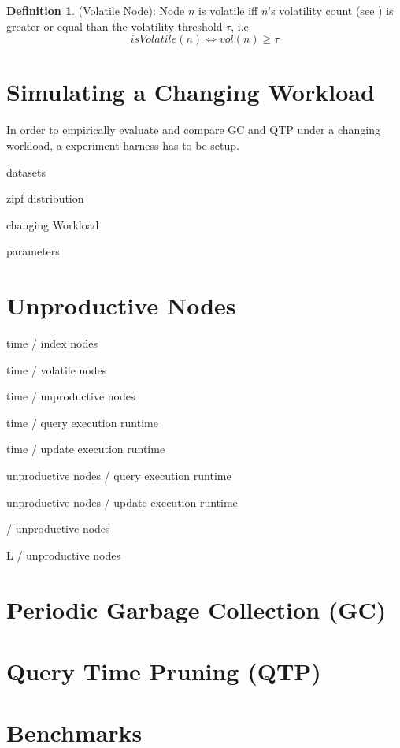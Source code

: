 \documentclass[abstracton,12pt]{scrartcl}
\theoremstyle{definition}
\newtheorem{definition}{Definition}
\begin{document}
\begin{definition}
    (Volatile Node): Node $n$ is volatile iff $n$'s volatility count (see ) is greater or equal than the volatility threshold $\tau$, i.e 
    $$ isVolatile(n) \iff vol(n) \geq \tau $$
\end{definition}

\section{Simulating a Changing Workload}

In order to empirically evaluate and compare GC and QTP under a changing workload, a experiment harness has to be setup.

datasets

zipf distribution

changing Workload

parameters

\section{Unproductive Nodes}

time / index nodes

time / volatile nodes

time / unproductive nodes

time / query execution runtime

time / update execution runtime

unproductive nodes / query execution runtime

unproductive nodes / update execution runtime

\tau / unproductive nodes

L / unproductive nodes

\section{Periodic Garbage Collection (GC)}

\section{Query Time Pruning (QTP)}

\section{Benchmarks}

\newpage
\end{document}
